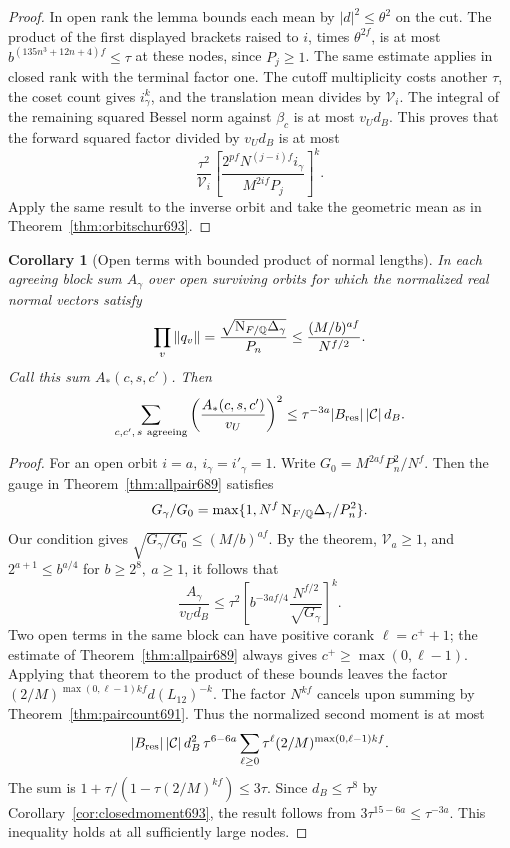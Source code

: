 \documentclass[a4paper,11pt]{article}
\newtheorem{corollary}[proposition]{Corollary}
\theoremstyle{definition}
\theoremstyle{remark}
\numberwithin{equation}{section}
\begin{document}
\begin{proof}
In open rank the lemma bounds each mean by \(|d|^2\le\theta^2\)
on the cut. The product of the first displayed brackets raised
to \(i\), times \(\theta^{2f}\), is at most
\(b^{(135n^3+12n+4)f}\le\tau\) at these nodes, since
\(P_j\ge1\). The same estimate applies in closed rank with
the terminal factor one. The cutoff multiplicity costs another
\(\tau\), the coset count gives \(i_\gamma^k\), and the
translation mean divides by \(\mathcal V_i\). The integral
of the remaining squared Bessel norm against \(\beta_c\)
is at most \(v_Ud_B\). This proves that the forward squared
factor divided by \(v_Ud_B\) is at most
\[
       \frac{\tau^2}{\mathcal V_i}
       \left[\frac{2^{pf}N^{(j-i)f}i_\gamma}
                         {M^{2if}P_j}\right]^k .
\]
Apply the same result to the inverse orbit and take the
geometric mean as in Theorem~\ref{thm:orbitschur693}.
\end{proof}

\begin{corollary}[Open terms with bounded product of normal lengths]
\leavevmode\label{cor:normalrange694}
In each agreeing block sum \(A_\gamma\) over open surviving
orbits for which the normalized real normal vectors satisfy
\[
       \prod_v\|q_v\|
       =\frac{\sqrt{{\rm N}_{F/\mathbb Q}\Delta_\gamma}}{P_n}
       \le \frac{(M/b)^{af}}{N^{f/2}} .
\]
Call this sum \(A_*(c,s,c')\). Then
\[
     \sum_{c,c',\,s\ {\rm agreeing}}
       \left(\frac{A_*(c,s,c')}{v_U}\right)^2
       \le \tau^{-3a}|B_{\rm res}|\,|\mathcal C|\,d_B .
\]
\end{corollary}
\begin{proof}
For an open orbit \(i=a,\ i_\gamma=i'_\gamma=1\). Write
\(G_0=M^{2af}P_n^2/N^f\). Then the gauge in
Theorem~\ref{thm:allpair689} satisfies
\[
       G_\gamma/G_0
          =\max\{1,N^f\,{\rm N}_{F/\mathbb Q}\Delta_\gamma/P_n^2\}.
\]
Our condition gives \(\sqrt{G_\gamma/G_0}\le (M/b)^{af}\).
By the theorem, \(\mathcal V_a\ge1\), and
\(2^{a+1}\le b^{a/4}\) for \(b\ge 2^8,\ a\ge1\), it follows that
\[
        \frac{A_\gamma}{v_Ud_B}
         \le \tau^2
            \left[b^{-3af/4}\frac{N^{f/2}}{\sqrt{G_\gamma}}\right]^k.
\]
Two open terms in the same block can have positive corank
\(\ell=c^++1\); the estimate of Theorem~\ref{thm:allpair689}
always gives \(c^+\ge\max(0,\ell-1)\). Applying that theorem
to the product of these bounds leaves the factor
\((2/M)^{\max(0,\ell-1)kf}d(L_{12})^{-k}\). The factor
\(N^{kf}\) cancels upon summing by Theorem~\ref{thm:paircount691}.
Thus the normalized second moment is at most
\[
 |B_{\rm res}|\,|\mathcal C|\,d_B^2\,
 \tau^{6-6a}
   \sum_{\ell\ge0}\tau^\ell(2/M)^{\max(0,\ell-1)kf}.
\]
The sum is \(1+\tau/(1-\tau(2/M)^{kf})\le3\tau\).
Since \(d_B\le\tau^8\) by Corollary~\ref{cor:closedmoment693},
the result follows from \(3\tau^{15-6a}\le\tau^{-3a}\).
This inequality holds at all sufficiently large nodes.
\end{proof}
\end{document}
